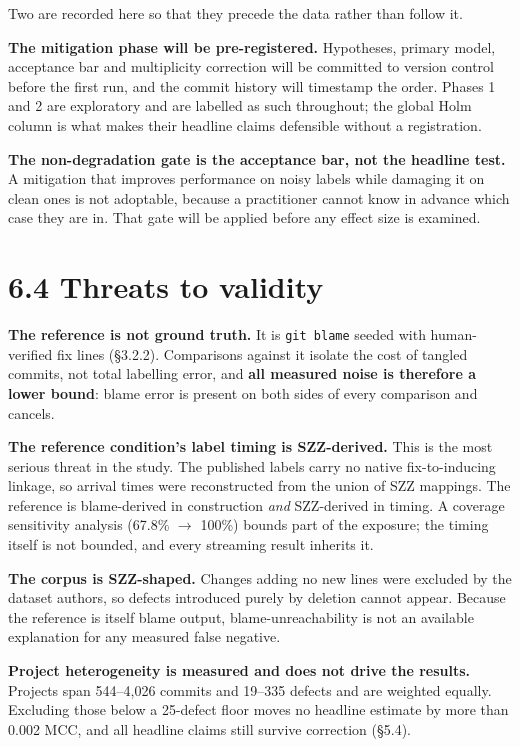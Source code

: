 Two are recorded here so that they precede the data rather than follow
it.

\textbf{The mitigation phase will be pre-registered.} Hypotheses,
primary model, acceptance bar and multiplicity correction will be
committed to version control before the first run, and the commit
history will timestamp the order. Phases 1 and 2 are exploratory and are
labelled as such throughout; the global Holm column is what makes their
headline claims defensible without a registration.

\textbf{The non-degradation gate is the acceptance bar, not the headline
test.} A mitigation that improves performance on noisy labels while
damaging it on clean ones is not adoptable, because a practitioner
cannot know in advance which case they are in. That gate will be applied
before any effect size is examined.

\section{6.4 Threats to validity}\label{threats-to-validity}

\textbf{The reference is not ground truth.} It is \texttt{git\ blame}
seeded with human-verified fix lines (\S{}3.2.2). Comparisons against it
isolate the cost of tangled commits, not total labelling error, and
\textbf{all measured noise is therefore a lower bound}: blame error is
present on both sides of every comparison and cancels.

\textbf{The reference condition's label timing is SZZ-derived.} This is
the most serious threat in the study. The published labels carry no
native fix-to-inducing linkage, so arrival times were reconstructed from
the union of SZZ mappings. The reference is blame-derived in
construction \emph{and} SZZ-derived in timing. A coverage sensitivity
analysis (67.8\% \ensuremath{\rightarrow} 100\%) bounds part of the exposure; the timing itself
is not bounded, and every streaming result inherits it.

\textbf{The corpus is SZZ-shaped.} Changes adding no new lines were
excluded by the dataset authors, so defects introduced purely by
deletion cannot appear. Because the reference is itself blame output,
blame-unreachability is not an available explanation for any measured
false negative.

\textbf{Project heterogeneity is measured and does not drive the
results.} Projects span 544--4,026 commits and 19--335 defects and are
weighted equally. Excluding those below a 25-defect floor moves no
headline estimate by more than 0.002 MCC, and all headline claims still
survive correction (\S{}5.4).

